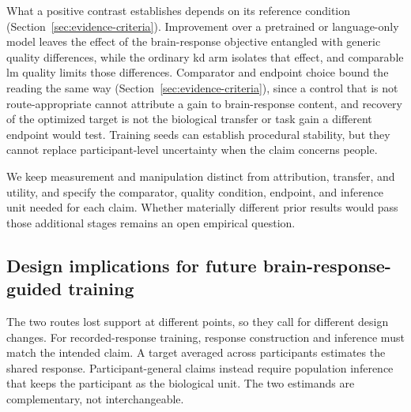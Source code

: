 What a positive contrast establishes depends on its reference condition (Section~\ref{sec:evidence-criteria}).
Improvement over a pretrained or language-only model leaves the effect of the brain-response objective entangled with generic quality differences, while the ordinary \ac{kd} arm isolates that effect, and comparable \ac{lm} quality limits those differences.
Comparator and endpoint choice bound the reading the same way (Section~\ref{sec:evidence-criteria}), since a control that is not route-appropriate cannot attribute a gain to brain-response content, and recovery of the optimized target is not the biological transfer or task gain a different endpoint would test.
Training seeds can establish procedural stability, but they cannot replace participant-level uncertainty when the claim concerns people.

We keep measurement and manipulation distinct from attribution, transfer, and utility, and specify the comparator, quality condition, endpoint, and inference unit needed for each claim.
Whether materially different prior results would pass those additional stages remains an open empirical question.

\subsection{Design implications for future brain-response-guided training}
\label{sec:discussion-design}

The two routes lost support at different points, so they call for different design changes.
For recorded-response training, response construction and inference must match the intended claim.
A target averaged across participants estimates the shared response.
Participant-general claims instead require population inference that keeps the participant as the biological unit.
The two estimands are complementary, not interchangeable.

